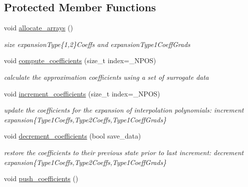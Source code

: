 \subsection*{Protected Member Functions}
\begin{DoxyCompactItemize}
\item 
void \hyperlink{classPecos_1_1HierarchInterpPolyApproximation_a37ef37829b412fefa40d53b395846781}{allocate\+\_\+arrays} ()\label{classPecos_1_1HierarchInterpPolyApproximation_a37ef37829b412fefa40d53b395846781}

\begin{DoxyCompactList}\small\item\em size expansion\+Type\{1,2\}Coeffs and expansion\+Type1\+Coeff\+Grads \end{DoxyCompactList}\item 
void \hyperlink{classPecos_1_1HierarchInterpPolyApproximation_aef8f0c32bdeff7756a9c614607c03058}{compute\+\_\+coefficients} (size\+\_\+t index=\+\_\+\+N\+P\+OS)\label{classPecos_1_1HierarchInterpPolyApproximation_aef8f0c32bdeff7756a9c614607c03058}

\begin{DoxyCompactList}\small\item\em calculate the approximation coefficients using a set of surrogate data \end{DoxyCompactList}\item 
void \hyperlink{classPecos_1_1HierarchInterpPolyApproximation_a8ba12605934048176c1d1c5722465523}{increment\+\_\+coefficients} (size\+\_\+t index=\+\_\+\+N\+P\+OS)\label{classPecos_1_1HierarchInterpPolyApproximation_a8ba12605934048176c1d1c5722465523}

\begin{DoxyCompactList}\small\item\em update the coefficients for the expansion of interpolation polynomials\+: increment expansion\{Type1\+Coeffs,Type2\+Coeffs,Type1\+Coeff\+Grads\} \end{DoxyCompactList}\item 
void \hyperlink{classPecos_1_1HierarchInterpPolyApproximation_a662fd880fee0ed53f1e3383c41d6b792}{decrement\+\_\+coefficients} (bool save\+\_\+data)\label{classPecos_1_1HierarchInterpPolyApproximation_a662fd880fee0ed53f1e3383c41d6b792}

\begin{DoxyCompactList}\small\item\em restore the coefficients to their previous state prior to last increment\+: decrement expansion\{Type1\+Coeffs,Type2\+Coeffs,Type1\+Coeff\+Grads\} \end{DoxyCompactList}\item 
void \hyperlink{classPecos_1_1HierarchInterpPolyApproximation_a150c32326f6c12d2303806005715706e}{push\+\_\+coefficients} ()\label{classPecos_1_1HierarchInterpPolyApproximation_a150c32326f6c12d2303806005715706e}


\end{DoxyCompactItemize}
